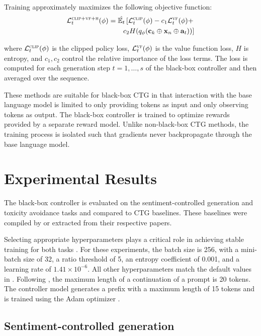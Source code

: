\documentclass[phd,electronic,oneside,twosidetoc,letterpaper,chaptercenter,parttop,lof]{byumsphd}
\begin{document}
Training approximately maximizes the following objective function:
\begin{align*}
    \mathcal{L}_t^{\textsc{clip}+\textsc{vf}+\textsc{h}} (\phi) = \hat{\mathbb{E}_t} \left[ \mathcal{L}_t^{\textsc{clip}} (\phi) - c_1 \mathcal{L}_t^{\textsc{vf}}(\phi) + \right.\\
    \left. c_2 H(q_\phi(\mathbf{c}_{k} \oplus \mathbf{x}_n \oplus \mathbf{a}_t)) \right]
\end{align*}

\noindent where \(\mathcal{L}_t^{\textsc{clip}}(\phi)\) is the clipped policy loss, \(\mathcal{L}_t^{\textsc{vf}}(\phi)\) is the value function loss, \(H\) is entropy, and \(c_1, c_2\) control the relative importance of the loss terms.  The loss is computed for each generation step \(t = 1, \ldots, s\) of the black-box controller and then averaged over the sequence.

These methods are suitable for black-box CTG in that interaction with the base language model is limited to only providing tokens as input and only observing tokens as output. The black-box controller is trained to optimize rewards provided by a separate reward model. Unlike non-black-box CTG methods, the training process is isolated such that gradients never backpropagate through the base language model.

\section{Experimental Results}
\label{experiments}

The black-box controller is evaluated on the sentiment-controlled generation and toxicity avoidance tasks and compared to CTG baselines.
These baselines were compiled by \cite{liu2021dexpert} or extracted from their respective papers.

Selecting appropriate hyperparameters plays a critical role in achieving stable training for both tasks
\cite{ziegler2019preferences}. For these experiments, the batch size is 256, with a mini-batch size of 32, a ratio threshold of 5, an entropy coefficient of 0.001, and a learning rate of \(1.41 \times 10^{-6}\). All other hyperparameters match the default values in \cite{vonwerra2022trl}.
Following \cite{liu2021dexpert}, the maximum length of a continuation of a prompt is 20 tokens.
The controller model generates a prefix with a maximum length of 15 tokens and is trained using the Adam optimizer \cite{kingma2017adam}.

\subsection{Sentiment-controlled generation}
\end{document}
